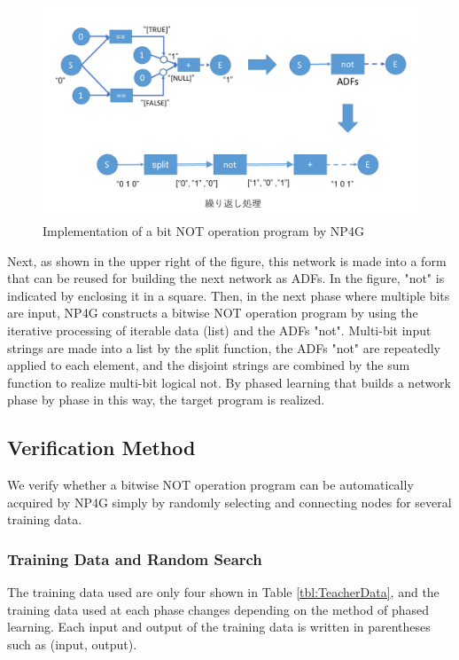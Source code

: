 \documentclass{article}
\begin{document}
\begin{figure}[t]
    \begin{center}
        \includegraphics[width=150mm]{bitwise_not.png}
    \end{center}
    \caption{Implementation of a bit NOT operation program by NP4G}
    \label{fig:bitwise_not}
\end{figure}

Next, as shown in the upper right of the figure, this network is made into a form that can be reused for building the next network as ADFs.
In the figure, "not" is indicated by enclosing it in a square.
Then, in the next phase where multiple bits are input, NP4G constructs a bitwise NOT operation program by using the iterative processing of iterable data (list) and the ADFs "not".
Multi-bit input strings are made into a list by the split function, the ADFs "not" are repeatedly applied to each element, and the disjoint strings are combined by the sum function to realize multi-bit logical not.
By phased learning that builds a network phase by phase in this way, the target program is realized.

\subsection {Verification Method}
We verify whether a bitwise NOT operation program can be automatically acquired by NP4G simply by randomly selecting and connecting nodes for several training data.

\subsubsection {Training Data and Random Search}
The training data used are only four shown in Table \ref{tbl:TeacherData}, and the training data used at each phase changes depending on the method of phased learning.
Each input and output of the training data is written in parentheses such as (input, output).
\end{document}
